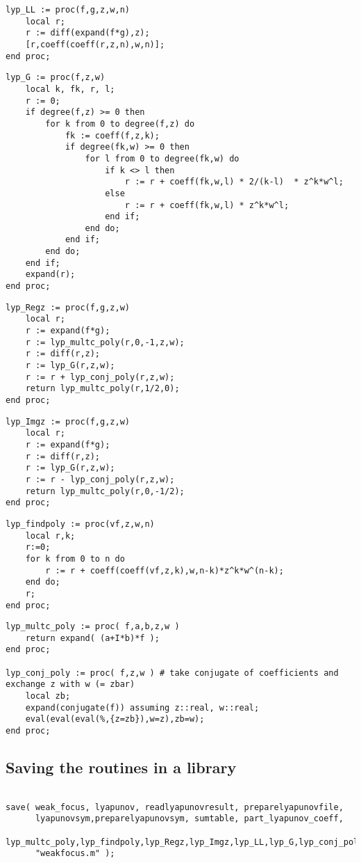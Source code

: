 \documentclass[a4paper,10pt]{article}
\begin{document}
\begin{lstlisting}[name=weakfocus]
lyp_LL := proc(f,g,z,w,n)
    local r;
    r := diff(expand(f*g),z);
    [r,coeff(coeff(r,z,n),w,n)];
end proc;
\end{lstlisting}

\begin{lstlisting}[name=weakfocus]
lyp_G := proc(f,z,w)
    local k, fk, r, l;
    r := 0;
    if degree(f,z) >= 0 then
        for k from 0 to degree(f,z) do
            fk := coeff(f,z,k);
            if degree(fk,w) >= 0 then
                for l from 0 to degree(fk,w) do
                    if k <> l then
                        r := r + coeff(fk,w,l) * 2/(k-l)  * z^k*w^l;
                    else
                        r := r + coeff(fk,w,l) * z^k*w^l;
                    end if;
                end do;
            end if;
        end do;
    end if;
    expand(r);
end proc;
\end{lstlisting}

\begin{lstlisting}[name=weakfocus]
lyp_Regz := proc(f,g,z,w)
    local r;
    r := expand(f*g);
    r := lyp_multc_poly(r,0,-1,z,w);
    r := diff(r,z);
    r := lyp_G(r,z,w);
	r := r + lyp_conj_poly(r,z,w);
    return lyp_multc_poly(r,1/2,0);
end proc;
\end{lstlisting}

\begin{lstlisting}[name=weakfocus]
lyp_Imgz := proc(f,g,z,w)
    local r;
    r := expand(f*g);
    r := diff(r,z);
    r := lyp_G(r,z,w);
	r := r - lyp_conj_poly(r,z,w);
    return lyp_multc_poly(r,0,-1/2);
end proc;
\end{lstlisting}

\begin{lstlisting}[name=weakfocus]
lyp_findpoly := proc(vf,z,w,n)
    local r,k;
    r:=0;
    for k from 0 to n do
        r := r + coeff(coeff(vf,z,k),w,n-k)*z^k*w^(n-k);
    end do;
    r;
end proc;

\end{lstlisting}

\begin{lstlisting}[name=weakfocus]
lyp_multc_poly := proc( f,a,b,z,w )
    return expand( (a+I*b)*f );
end proc;

lyp_conj_poly := proc( f,z,w ) # take conjugate of coefficients and exchange z with w (= zbar)
    local zb;
    expand(conjugate(f)) assuming z::real, w::real;
    eval(eval(eval(%,{z=zb}),w=z),zb=w);
end proc;
\end{lstlisting}

\subsection{Saving the routines in a library}

\begin{lstlisting}[name=weakfocus]

save( weak_focus, lyapunov, readlyapunovresult, preparelyapunovfile,
      lyapunovsym,preparelyapunovsym, sumtable, part_lyapunov_coeff,
      lyp_multc_poly,lyp_findpoly,lyp_Regz,lyp_Imgz,lyp_LL,lyp_G,lyp_conj_poly,
      "weakfocus.m" );

\end{lstlisting}
\end{document}

